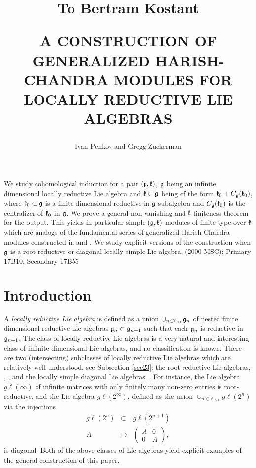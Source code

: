 \documentclass[12pt]{article}
\title{ \begin{flushright}
\begin{small}
To Bertram Kostant\end{small}
\bigskip
\end{flushright}
A CONSTRUCTION OF GENERALIZED HARISH-CHANDRA MODULES FOR LOCALLY REDUCTIVE LIE ALGEBRAS}
\author{ Ivan Penkov and Gregg Zuckerman}
\date{}
\newcounter{theorem}
\newcommand {\ZZ} {\mathbb {Z}}
\renewcommand{\gg}{\mathfrak{g}}
\newcommand{\gl}{{g\ell}}
\begin{document}
\maketitle \abstract We study cohomological induction for a pair $(\frak g,\frak k)$, $\frak g$ being an infinite dimensional locally reductive Lie algebra and $\frak k \subset\frak g$ being of the form $\frak k_0 + C_\gg(\frak k_0)$, where $\frak k_0\subset\frak g$ is a finite dimensional reductive in $\frak g$ subalgebra and $C_{\gg} (\frak k_0)$ is the centralizer of $\frak k_0$ in $\frak g$.  We prove a general non-vanishing and $\frak k$-finiteness theorem for the output.  This yields in particular simple $(\frak g,\frak k)$-modules of finite type over $\frak k$ which are analogs of the fundamental series of generalized Harish-Chandra modules constructed in \cite{PZ1} and \cite{PZ2}.  We study explicit versions of the construction when $\frak g$ is a root-reductive or diagonal locally simple Lie algebra.
\endabstract
{ (2000 MSC): Primary 17B10, Secondary 17B55 }

\section{Introduction}

A \emph{locally reductive Lie algebra} is defined as a union $\cup_{n\in\ZZ_{> 0}}\frak g_n$ of nested finite dimensional reductive Lie algebras $\frak g_n \subset \frak g_{n+1}$ such that each $\frak g_n$ is reductive in $\frak g_{n+1}$.  The class of locally reductive Lie algebras is a very natural and interesting class of infinite dimensional Lie algebras, and no classification is known.  There are two (intersecting) subclasses of locally reductive Lie algebras which are relatively well-understood, see Subsection \ref{sec23}: the root-reductive Lie algebras, \cite{DP}, \cite{B}, and the locally simple diagonal Lie algebras, \cite{BZh}.  For instance, the Lie algebra $\gl (\infty)$ of infinite matrices with only finitely many non-zero entries is root-reductive, and the Lie algebra $\gl (2^\infty)$, defined as the union $\cup_{n\in\ZZ_{> 0}} \gl(2^n)$ via the injections
\begin{eqnarray*}
\gl (2^n)  &\subset & \gl (2^{n+1}) \\
A &\longmapsto &\begin{pmatrix} A & 0 \\ 0 & A\end{pmatrix},
\end{eqnarray*}
is diagonal. Both of the above classes of Lie algebras yield explicit examples of the general construction of this paper.
\end{document}
